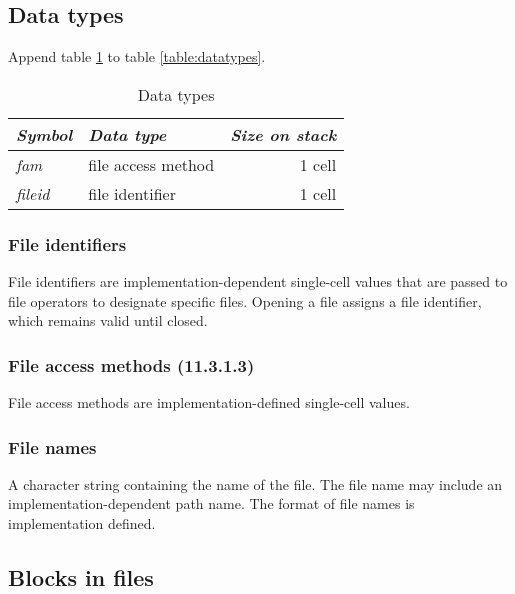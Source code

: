 \subsection{Data types} %

Append table \ref{file:types} to table \ref{table:datatypes}.

\begin{table}[h]
  \begin{center}
	\caption{Data types}
	\label{file:types}
	\begin{tabular}{llr}
	\hline\hline
	\emph{Symbol} & \emph{Data type} & \emph{Size on stack} \\
	\hline
	\emph{fam}		& file access method	& 1 cell \\
	\emph{fileid}	& file identifier		& 1 cell \\
	\hline\hline
	\end{tabular}
  \end{center}
\end{table}

\subsubsection{File identifiers} %

File identifiers are implementation-dependent single-cell values
that are passed to file operators to designate specific files.
Opening a file assigns a file identifier, which remains valid
until closed.

\setcounter{subsubsection}{2}
\subsubsection{File access methods (11.3.1.3)} %

File access methods are implementation-defined single-cell
values.

\subsubsection{File names} %
\label{file:names}

A character string containing the name of the file. The file name
may include an implementation-dependent path name. The format of
file names is implementation defined.

\subsection{Blocks in files} %
\label{file:blocks}

